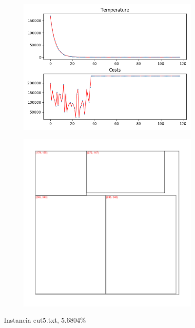 \begin{figure}
\centering
\begin{subfigure}{.5\textwidth}
  \centering
  \includegraphics[width=1\linewidth]{results/cut5/2/plot}
  \label{fig:sub1}
\end{subfigure}%
\begin{subfigure}{.5\textwidth}
  \centering
  \includegraphics[width=1\linewidth]{results/cut5/2/cut}
  \label{fig:sub2}
\end{subfigure}
\caption{Instancia cut5.txt, 5.6804\%}
\label{fig:test}
\end{figure}


